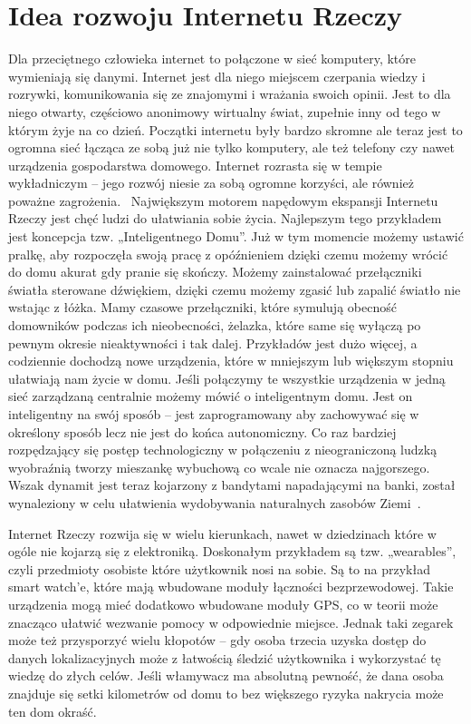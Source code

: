 \documentclass[brudnopis]{xmgr}
\begin{document}
\section{Idea rozwoju Internetu Rzeczy}
Dla przeciętnego człowieka internet to połączone w sieć komputery, które wymieniają się danymi. Internet jest dla niego miejscem czerpania wiedzy i rozrywki, komunikowania się ze znajomymi i wrażania swoich opinii. Jest to dla niego otwarty, częściowo anonimowy wirtualny świat, zupełnie inny od tego w którym żyje na co dzień. Początki internetu były bardzo skromne ale teraz jest to ogromna sieć łącząca ze sobą już nie tylko komputery, ale też telefony czy nawet urządzenia gospodarstwa domowego. Internet rozrasta się w tempie wykładniczym – jego rozwój niesie za sobą ogromne korzyści, ale również poważne zagrożenia.~\cite{Nsr:2015:CMC}
Największym motorem napędowym ekspansji Internetu Rzeczy jest chęć ludzi do ułatwiania sobie życia. Najlepszym tego przykładem jest koncepcja tzw. „Inteligentnego Domu”. Już w tym momencie możemy ustawić pralkę, aby rozpoczęła swoją pracę z opóźnieniem dzięki czemu możemy wrócić do domu akurat gdy pranie się skończy. Możemy zainstalować przełączniki światła sterowane dźwiękiem, dzięki czemu możemy zgasić lub zapalić światło nie wstając z łóżka. Mamy czasowe przełączniki, które symulują obecność domowników podczas ich nieobecności, żelazka, które same się wyłączą po pewnym okresie nieaktywności i tak dalej. Przykładów jest dużo więcej, a codziennie dochodzą nowe urządzenia, które w mniejszym lub większym stopniu ułatwiają nam życie w domu. Jeśli połączymy te wszystkie urządzenia w jedną sieć zarządzaną centralnie możemy mówić o inteligentnym domu. Jest on inteligentny na swój sposób – jest zaprogramowany aby zachowywać się w określony sposób lecz nie jest do końca autonomiczny. Co raz bardziej rozpędzający się postęp technologiczny w połączeniu z nieograniczoną ludzką wyobraźnią tworzy mieszankę wybuchową co wcale nie oznacza najgorszego. Wszak dynamit jest teraz kojarzony z bandytami napadającymi na banki, został wynaleziony w celu ułatwienia wydobywania naturalnych zasobów Ziemi~\cite{Rethinking}.

Internet Rzeczy rozwija się w wielu kierunkach, nawet w dziedzinach które w ogóle nie kojarzą się z elektroniką. Doskonałym przykładem są tzw. „wearables”, czyli przedmioty osobiste które użytkownik nosi na sobie. Są to na przykład smart watch'e, które mają wbudowane moduły łączności bezprzewodowej.  Takie urządzenia mogą mieć dodatkowo wbudowane moduły GPS, co w teorii może znacząco ułatwić wezwanie pomocy w odpowiednie miejsce. Jednak taki zegarek może też przysporzyć wielu kłopotów – gdy osoba trzecia uzyska dostęp do danych lokalizacyjnych  może z łatwością śledzić użytkownika i wykorzystać tę wiedzę do złych celów. Jeśli włamywacz ma absolutną pewność, że dana osoba znajduje się setki kilometrów od domu to bez większego ryzyka nakrycia może ten dom okraść.
\end{document}
